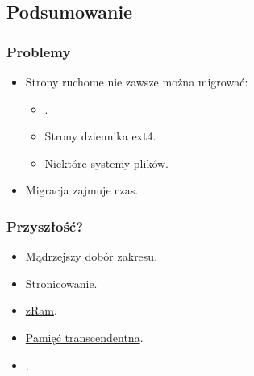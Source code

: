 
\subsection{Podsumowanie}

\begin{frame}
  \frametitle{Problemy}

  \begin{itemize}
  \item Strony ruchome nie zawsze można migrować:
    \begin{itemize}
    \item {}.
    \item Strony dziennika ext4.
    \item Niektóre systemy plików.
    \end{itemize}
  \item Migracja zajmuje czas.
  \end{itemize}
\end{frame}

\begin{frame}
  \frametitle{Przyszłość?}
  \begin{itemize}
  \item Mądrzejszy dobór zakresu.
  \end{itemize}

  \begin{itemize}
  \item Stronicowanie.
  \item \href{http://code.google.com/p/compcache}{zRam}.
  \item \href{http://lwn.net/Articles/340080/}{Pamięć transcendentna}.
  \item \href{http://lwn.net/Articles/468896/}{}.
  \end{itemize}
\end{frame}
